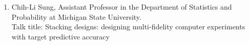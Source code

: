 \begin{talk}
\begin{enumerate}

\item Chih-Li Sung, Assistant Professor in the Department of Statistics and Probability at Michigan State University.\\
Talk title: Stacking designs: designing multi-fidelity computer experiments with target predictive accuracy


\end{enumerate}
\end{talk}
